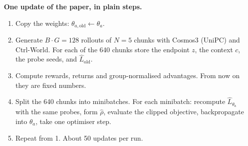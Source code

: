 \documentclass[11pt,a4paper]{article}
\newcommand{\Lh}{\hat L}
\begin{document}
\begin{paperlink}
\textbf{One update of the paper, in plain steps.}
\begin{enumerate}[leftmargin=*]
\item Copy the weights: $\theta_{a,\mathrm{old}}\leftarrow\theta_a$.
\item Generate $B\cdot G=128$ rollouts of $N=5$ chunks with Cosmos3 (UniPC) and Ctrl-World. For each of the 640 chunks store the endpoint $z$, the context $c$, the probe seeds, and $\Lh_{\mathrm{old}}$.
\item Compute rewards, returns and group-normalised advantages. From now on they are fixed numbers.
\item Split the 640 chunks into minibatches. For each minibatch: recompute $\Lh_{\theta_a}$ with the same probes, form $\hat\rho$, evaluate the clipped objective, backpropagate into $\theta_a$, take one optimiser step.
\item Repeat from 1. About 50 updates per run.
\end{enumerate}
\end{paperlink}

\end{document}
